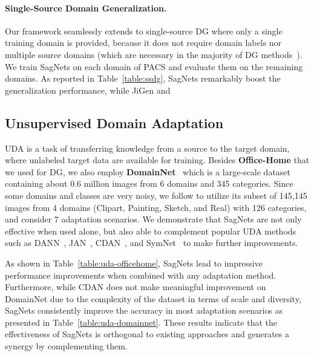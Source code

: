 \paragraph{\textnormal{\textbf{Single-Source Domain Generalization.}}}
Our framework seamlessly extends to single-source DG where only a single training domain is provided, because it does not require domain labels nor multiple source domains (which are necessary in the majority of DG methods~\cite{li2017deeper,innocente2018domain,li2019episodic,dou2019domain}).
We train SagNets on each domain of PACS and evaluate them on the remaining domains.
As reported in Table~\ref{table:ssdg}, SagNets remarkably boost the generalization performance, while JiGen and 


\subsection{Unsupervised Domain Adaptation}
\label{sec:exp-uda}
UDA is a task of transferring knowledge from a source to the target domain, where unlabeled target data are available for training.
Besides \textbf{Office-Home} that we used for DG, we also employ \textbf{DomainNet}~\cite{peng2019moment} which is a large-scale dataset containing about 0.6 million images from 6 domains and 345 categories.
Since some domains and classes are very noisy, we follow \cite{saito2019semi} to utilize its subset of 145,145 images from 4 domains (Clipart, Painting, Sketch, and Real) with 126 categories, and consider 7 adaptation scenarios.
We demonstrate that SagNets are not only effective when used alone, but also able to complement popular UDA methods such as DANN~\cite{ganin2016domain}, JAN~\cite{long2017deep}, CDAN~\cite{mingsheng2018conditional}, and SymNet~\cite{zhang2019domain} to make further improvements.



As shown in Table~\ref{table:uda-officehome}, SagNets lead to impressive performance improvements when combined with any adaptation method.
Furthermore, while CDAN does not make meaningful improvement on DomainNet due to the complexity of the dataset in terms of scale and diversity, SagNets consistently improve the accuracy in most adaptation scenarios as presented in Table~\ref{table:uda-domainnet}.
These results indicate that the effectiveness of SagNets is orthogonal to existing approaches and generates a synergy by complementing them.


